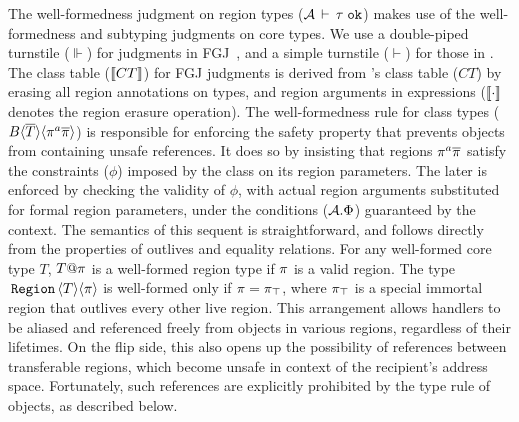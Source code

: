 \noindent The well-formedness judgment on region types
(${\mathcal{A}}\,\vdash\,\tau \; \texttt{ok}$) makes use of the well-formedness and subtyping
judgments on core types. We use a double-piped turnstile ($\Vdash$)
for judgments in FGJ~\cite{fgj}, and a simple turnstile ($\vdash$) for
those in \FB. The class table ($\llbracket CT \rrbracket$) for FGJ judgments is
derived from \FB's class table ($CT$) by erasing all region
annotations on types, and region arguments in expressions
($\llbracket \cdot \rrbracket$ denotes the region erasure operation). 
The well-formedness rule for class types
($B\langle \overline{T} \rangle\langle \pi^a\overline{\pi} \rangle$) is responsible for enforcing
the safety property that prevents objects from containing unsafe
references. It does so by insisting that regions $\pi^a\overline{\pi}$
satisfy the constraints ($\phi$) imposed by the class on its region
parameters. The later is enforced by checking the validity of $\phi$,
with actual region arguments substituted for formal
region parameters, under the conditions (${\mathcal{A}}.\Phi$) guaranteed by
the context. The semantics of this sequent is straightforward, and
follows directly from the properties of outlives and equality
relations. For any well-formed core type $T$, $T@\pi$ is a
well-formed region type if $\pi$ is a valid region. The type
$\,{\tt Region}\,\langle T \rangle\langle \pi \rangle$ is well-formed only if $\pi = \pi_{\top}$, where
$\pi_{\top}$ is a special immortal region that outlives every other live
region. This arrangement allows \C{\RgnZ} handlers to be aliased and
referenced freely from objects in various regions, regardless of their
lifetimes. On the flip side, this also opens up the possibility of
references between transferable regions, which become unsafe in
context of the recipient's address space. Fortunately, such
references are explicitly prohibited by the type rule of \C{\RgnZ}
objects, as described below.


